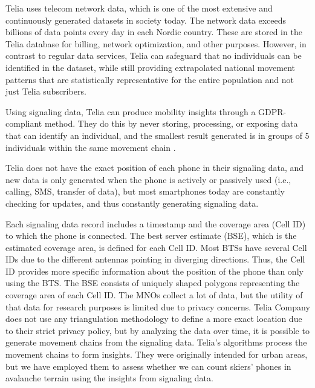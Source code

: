 \documentclass[authordate,empirical]{jote-new-article}
\begin{document}
Telia uses telecom network data, which is one of the most extensive and continuously generated datasets in society today. The network data exceeds billions of data points every day in each Nordic country. These are stored in the Telia database for billing, network optimization, and other purposes. However, in contrast to regular data services, Telia can safeguard that no individuals can be identified in the dataset, while still providing extrapolated national movement patterns that are statistically representative for the entire population and not just Telia subscribers.







Using signaling data, Telia can produce mobility insights through a GDPR-compliant method. They do this by never storing, processing, or exposing data that can identify an individual, and the smallest result generated is in groups of 5 individuals within the same movement chain \parencites{Ågren2021}.







Telia does not have the exact position of each phone in their signaling data, and new data is only generated when the phone is actively or passively used (i.e., calling, SMS, transfer of data), but most smartphones today are constantly checking for updates, and thus constantly generating signaling data.







Each signaling data record includes a timestamp and the coverage area (Cell ID) to which the phone is connected. The best server estimate (BSE), which is the estimated coverage area, is defined for each Cell ID. Most BTSs have several Cell IDs due to the different antennas pointing in diverging directions. Thus, the Cell ID provides more specific information about the position of the phone than only using the BTS. The BSE consists of uniquely shaped polygons representing the coverage area of each Cell ID. The MNOs collect a lot of data, but the utility of that data for research purposes is limited due to privacy concerns. Telia Company does not use any triangulation methodology to define a more exact location due to their strict privacy policy, but by analyzing the data over time, it is possible to generate movement chains from the signaling data. Telia’s algorithms process the movement chains to form insights. They were originally intended for urban areas, but we have employed them to assess whether we can count skiers’ phones in avalanche terrain using the insights from signaling data.
\end{document}
